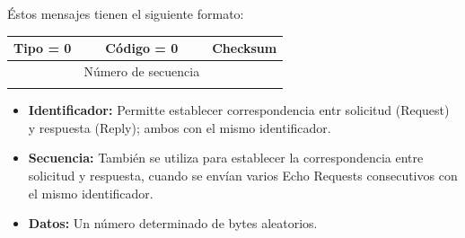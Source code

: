 Éstos mensajes tienen el siguiente formato:

\begin{table}[H]
\centering
\begin{tabular}{|c|c|c|}
\hline
\rowcolor[HTML]{9AFF99} 
Tipo = 0 & Código = 0  & Checksum \\ \hline
\rowcolor[HTML]{FDAAAA} 
\multicolumn{2}{|c|}{\cellcolor[HTML]{FDAAAA}{\color[HTML]{000000} Identificador}} & {\color[HTML]{000000} Número de secuencia} \\ \hline
\rowcolor[HTML]{FDAAAA} 
\multicolumn{3}{|c|}{\cellcolor[HTML]{FDAAAA}Datos :::}  \\ \hline
\end{tabular}
\end{table}
\begin{itemize}
    \item \textbf{Identificador:} Permitte establecer correspondencia entr solicitud (Request) y respuesta (Reply); ambos con el mismo identificador.
    \item \textbf{Secuencia:} También se utiliza para establecer la correspondencia entre solicitud y respuesta, cuando se envían varios Echo Requests consecutivos con el mismo identificador.
    \item \textbf{Datos:} Un número determinado de bytes aleatorios.
\end{itemize}

